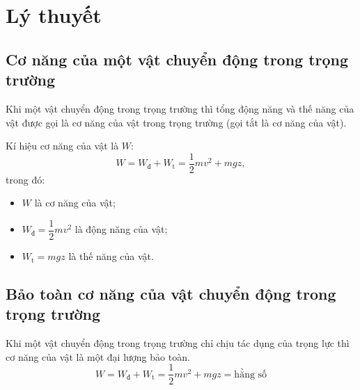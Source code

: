 \setcounter{section}{0}
\section{Lý thuyết}
\subsection{Cơ năng của một vật chuyển động trong trọng trường}
Khi một vật chuyển động trong trọng trường thì tổng động năng và thế năng của vật được gọi là cơ năng của vật trong trọng trường (gọi tắt là cơ năng của vật).

Kí hiệu cơ năng của vật là $W$:
\begin{equation*}
	W=W_\text{đ}+W_\text{t}=\dfrac{1}{2}mv^2+mgz\label{CT-conang},
\end{equation*}
trong đó:
\begin{itemize}
	\item $W$ là cơ năng của vật;
	\item $W_\text{đ}=\dfrac{1}{2}mv^2$ là động năng của vật;
	\item $W_\text{t}=mgz$ là thế năng của vật.
\end{itemize}

\subsection{Bảo toàn cơ năng của vật chuyển động trong trọng trường}
Khi một vật chuyển động trong trọng trường chỉ chịu tác dụng của trọng lực thì cơ năng của vật là một đại lượng bảo toàn.
\begin{equation*}
	W=W_\text{đ}+W_\text{t}=\dfrac{1}{2}mv^2+mgz=\textrm{hằng số}
\end{equation*}

